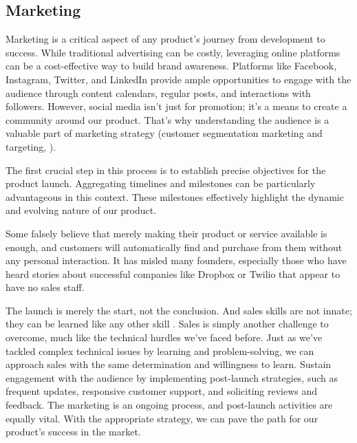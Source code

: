 
\subsection{Marketing}

Marketing is a critical aspect of any product's journey from development to success. While traditional advertising can 
be costly, leveraging online platforms can be a cost-effective way to build brand awareness. Platforms like Facebook, 
Instagram, Twitter, and LinkedIn provide ample opportunities to engage with the audience through content calendars, 
regular posts, and interactions with followers. However, social media isn't just for promotion; it's a means to 
create a community around our product. That's why understanding the audience is a valuable part of marketing strategy 
(customer segmentation marketing and targeting, \cite{Fras20}).

The first crucial step in this process is to establish precise objectives for the product launch. Aggregating timelines 
and milestones can be particularly advantageous in this context. These milestones effectively highlight the dynamic 
and evolving nature of our product.

Some falsely believe that merely making their product or service available is enough, and customers will automatically 
find and purchase from them without any personal interaction. It has misled many founders, especially those who have 
heard stories about successful companies like Dropbox or Twilio that appear to have no sales staff. 

The launch is merely the start, not the conclusion. And sales skills are not innate; they can be learned like any other 
skill \cite{Dixo11}. Sales is simply another challenge to overcome, much like the technical hurdles we've faced before. 
Just as we've tackled complex technical issues by learning and problem-solving, we can approach sales with the same 
determination and willingness to learn. Sustain engagement with the audience by implementing post-launch strategies, 
such as frequent updates, responsive customer support, and soliciting reviews and feedback. The marketing is an ongoing 
process, and post-launch activities are equally vital. With the appropriate strategy, we can pave the path for our 
product's success in the market.
